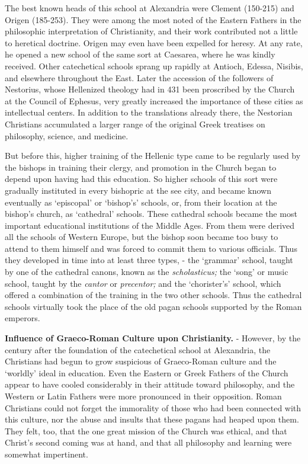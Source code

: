 \documentclass[
]{book}
\begin{document}
The best known heads of this school at Alexandria were Clement (150-215) and Origen (185-253). They were among the most noted of the Eastern Fathers in the philosophic interpretation of Christianity, and their work contributed not a little to heretical doctrine. Origen may even have been expelled for heresy. At any rate, he opened a new school of the same sort at Caesarea, where he was kindly received. Other catechetical schools sprang up rapidly at Antioch, Edessa, Nisibis, and elsewhere throughout the East. Later the accession of the followers of Nestorius, whose Hellenized theology had in 431 been proscribed by the Church at the Council of Ephesus, very greatly increased the importance of these cities as intellectual centers. In addition to the translations already there, the Nestorian Christians accumulated a larger range of the original Greek treatises on philosophy, science, and medicine.

But before this, higher training of the Hellenic type came to be regularly used by the bishops in training their clergy, and promotion in the Church began to depend upon having had this education. So higher schools of this sort were gradually instituted in every bishopric at the see city, and became known eventually as `episcopal' or `bishop's' schools, or, from their location at the bishop's church, as `cathedral' schools. These cathedral schools became the most important educational institutions of the Middle Ages. From them were derived all the schools of Western Europe, but the bishop soon became too busy to attend to them himself and was forced to commit them to various officials. Thus they developed in time into at least three types, - the `grammar' school, taught by one of the cathedral canons, known as the \emph{scholasticus;} the `song' or music school, taught by the \emph{cantor} or \emph{precentor;} and the `chorister's' school, which offered a combination of the training in the two other schools. Thus the cathedral schools virtually took the place of the old pagan schools supported by the Roman emperors.

\textbf{Influence of Graeco-Roman Culture upon Christianity.} - However, by the century after the foundation of the catechetical school at Alexandria, the Christians had begun to grow suspicious of Graeco-Roman culture and the `worldly' ideal in education. Even the Eastern or Greek Fathers of the Church appear to have cooled considerably in their attitude toward philosophy, and the Western or Latin Fathers were more pronounced in their opposition. Roman Christians could not forget the immorality of those who had been connected with this culture, nor the abuse and insults that these pagans had heaped upon them. They felt, too, that the one great mission of the Church was ethical, and that Christ's second coming was at hand, and that all philosophy and learning were somewhat impertinent.
\end{document}
